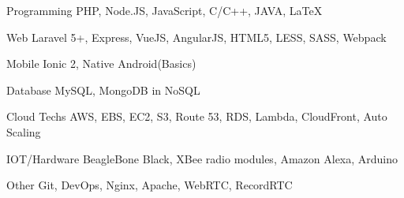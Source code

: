 

\begin{cvskills}

  \cvskill
    {Programming} %
    {PHP, Node.JS, JavaScript, C/C++, JAVA, LaTeX} %

  \cvskill
    {Web} %
    {Laravel 5+, Express, VueJS, AngularJS, HTML5, LESS, SASS, Webpack} %
    
  \cvskill
    {Mobile} %
    {Ionic 2, Native Android(Basics)} %

  \cvskill
    {Database} %
    {MySQL, MongoDB in NoSQL} %

  \cvskill
    {Cloud Techs} %
    {AWS, EBS, EC2, S3, Route 53, RDS, Lambda, CloudFront, Auto Scaling} %

  \cvskill
    {IOT/Hardware} %
    {BeagleBone Black, XBee radio modules, Amazon Alexa, Arduino} %

    
  \cvskill
    {Other} %
    {Git, DevOps, Nginx, Apache, WebRTC, RecordRTC} %
        
    
\end{cvskills}
